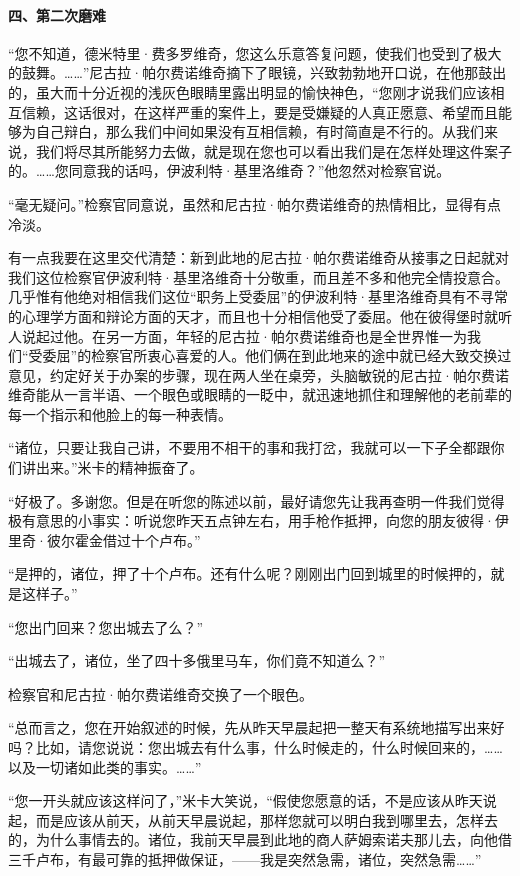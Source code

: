 \paragraph*{四、第二次磨难}
\par “您不知道，德米特里·费多罗维奇，您这么乐意答复问题，使我们也受到了极大的鼓舞。……”尼古拉·帕尔费诺维奇摘下了眼镜，兴致勃勃地开口说，在他那鼓出的，虽大而十分近视的浅灰色眼睛里露出明显的愉快神色，“您刚才说我们应该相互信赖，这话很对，在这样严重的案件上，要是受嫌疑的人真正愿意、希望而且能够为自己辩白，那么我们中间如果没有互相信赖，有时简直是不行的。从我们来说，我们将尽其所能努力去做，就是现在您也可以看出我们是在怎样处理这件案子的。……您同意我的话吗，伊波利特·基里洛维奇？”他忽然对检察官说。
\par “毫无疑问。”检察官同意说，虽然和尼古拉·帕尔费诺维奇的热情相比，显得有点冷淡。
\par 有一点我要在这里交代清楚：新到此地的尼古拉·帕尔费诺维奇从接事之日起就对我们这位检察官伊波利特·基里洛维奇十分敬重，而且差不多和他完全情投意合。几乎惟有他绝对相信我们这位“职务上受委屈”的伊波利特·基里洛维奇具有不寻常的心理学方面和辩论方面的天才，而且也十分相信他受了委屈。他在彼得堡时就听人说起过他。在另一方面，年轻的尼古拉·帕尔费诺维奇也是全世界惟一为我们“受委屈”的检察官所衷心喜爱的人。他们俩在到此地来的途中就已经大致交换过意见，约定好关于办案的步骤，现在两人坐在桌旁，头脑敏锐的尼古拉·帕尔费诺维奇能从一言半语、一个眼色或眼睛的一眨中，就迅速地抓住和理解他的老前辈的每一个指示和他脸上的每一种表情。
\par “诸位，只要让我自己讲，不要用不相干的事和我打岔，我就可以一下子全都跟你们讲出来。”米卡的精神振奋了。
\par “好极了。多谢您。但是在听您的陈述以前，最好请您先让我再查明一件我们觉得极有意思的小事实：听说您昨天五点钟左右，用手枪作抵押，向您的朋友彼得·伊里奇·彼尔霍金借过十个卢布。”
\par “是押的，诸位，押了十个卢布。还有什么呢？刚刚出门回到城里的时候押的，就是这样子。”
\par “您出门回来？您出城去了么？”
\par “出城去了，诸位，坐了四十多俄里马车，你们竟不知道么？”
\par 检察官和尼古拉·帕尔费诺维奇交换了一个眼色。
\par “总而言之，您在开始叙述的时候，先从昨天早晨起把一整天有系统地描写出来好吗？比如，请您说说：您出城去有什么事，什么时候走的，什么时候回来的，……以及一切诸如此类的事实。……”
\par “您一开头就应该这样问了，”米卡大笑说，“假使您愿意的话，不是应该从昨天说起，而是应该从前天，从前天早晨说起，那样您就可以明白我到哪里去，怎样去的，为什么事情去的。诸位，我前天早晨到此地的商人萨姆索诺夫那儿去，向他借三千卢布，有最可靠的抵押做保证，——我是突然急需，诸位，突然急需……”

